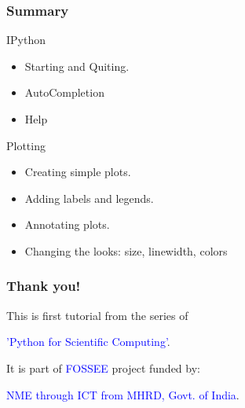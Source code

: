 \documentclass[14pt,compress]{beamer}
\begin{document}
\begin{frame}[fragile]
  \frametitle{Summary}
  \begin{block}{IPython}
    \begin{itemize}
    \item Starting and Quiting.
    \item AutoCompletion
    \item Help
    \end{itemize}
  \end{block}
  \begin{block}{Plotting}
    \begin{itemize}    
    \item Creating simple plots.
    \item Adding labels and legends.
    \item Annotating plots.
    \item Changing the looks: size, linewidth, colors
    \end{itemize}  
  \end{block}
\end{frame}

\begin{frame}
  \frametitle{Thank you!}  
  \begin{block}{}
    This is first tutorial from the series of
    \begin{center}      
      \textcolor{blue}{'Python for Scientific Computing'}.
    \end{center}
  \end{block}
  \begin{block}{}
  It is part of \textcolor{blue}{FOSSEE} project funded by:
  \begin{center}
    \textcolor{blue}{NME through ICT from MHRD, Govt. of India}.
  \end{center}  
  \end{block}
\end{frame}
\end{document}
